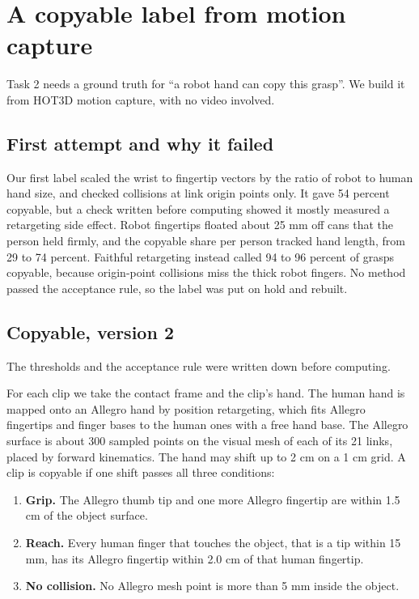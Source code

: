 \documentclass[10pt,twocolumn,letterpaper]{article}
\begin{document}
\section{A copyable label from motion capture}
\label{sec:label}

Task 2 needs a ground truth for ``a robot hand can copy this grasp''. We build
it from HOT3D motion capture, with no video involved.

\subsection{First attempt and why it failed}

Our first label scaled the wrist to fingertip vectors by the ratio of robot to
human hand size, and checked collisions at link origin points only. It gave 54
percent copyable, but a check written before computing showed it mostly
measured a retargeting side effect. Robot fingertips floated about 25 mm off
cans that the person held firmly, and the copyable share per person tracked
hand length, from 29 to 74 percent. Faithful retargeting instead called 94 to
96 percent of grasps copyable, because origin-point collisions miss the thick
robot fingers. No method passed the acceptance rule, so the label was put on
hold and rebuilt.

\subsection{Copyable, version 2}

The thresholds and the acceptance rule were written down before computing.

For each clip we take the contact frame and the clip's hand. The human hand is
mapped onto an Allegro hand by position retargeting, which fits Allegro
fingertips and finger bases to the human ones with a free hand base. The
Allegro surface is about 300 sampled points on the visual mesh of each of its
21 links, placed by forward kinematics. The hand may shift up to 2 cm on a 1 cm
grid. A clip is copyable if one shift passes all three conditions:

\begin{enumerate}
\item \textbf{Grip.} The Allegro thumb tip and one more Allegro fingertip are
within 1.5 cm of the object surface.
\item \textbf{Reach.} Every human finger that touches the object, that is a tip
within 15 mm, has its Allegro fingertip within 2.0 cm of that human fingertip.
\item \textbf{No collision.} No Allegro mesh point is more than 5 mm inside the
object.
\end{enumerate}
\end{document}
